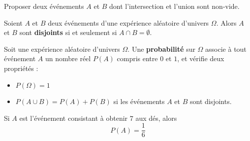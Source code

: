 \documentclass{poly}
\begin{document}
\begin{center}
\end{center}
\begin{example}
Proposer deux événements $A$ et $B$ dont l'intersection et l'union sont non-vide.

\end{example}
\newpage
\begin{definition}
Soient $A$ et $B$ deux événements d'une expérience aléatoire d'univers $\Omega$. Alors $A$ et $B$ sont \textbf{disjoints} si et seulement si $A \cap B = \emptyset$.
\end{definition}
\begin{definition}
Soit une expérience aléatoire d'univers $\Omega$. Une \textbf{probabilité} sur $\Omega$ associe à tout événement $A$ un nombre réel $P(A)$ compris entre $0$ et $1$, et vérifie deux propriétés :
\begin{itemize}
\item $P(\Omega) = 1$
\item $P(A \cup B) = P(A) + P(B)$ si les événements $A$ et $B$ sont disjoints.
\end{itemize}
\end{definition}
\begin{example}
Si $A$ est l'événement consistant à obtenir $7$ aux dés, alors
\begin{equation*}
P(A) = \dfrac{1}{6}
\end{equation*}
\end{example}
\end{document}
